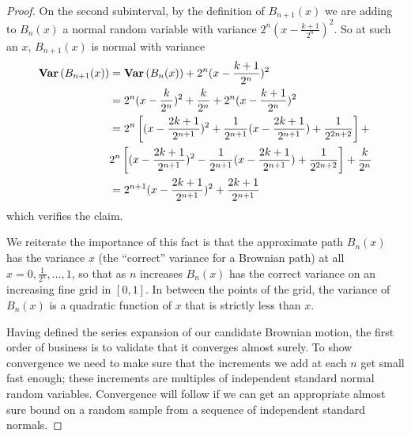\begin{proof}
On the second subinterval, by the definition of $B_{n+1}(x)$ we are
adding to $B_n(x)$ a normal random variable with variance
$2^n(x-\frac{k+1}{2^n})^2$.  So at such an $x$, $B_{n+1}(x)$ is normal
with variance 
\begin{align*}
\textbf{Var} \left (B_{n+1}(x) \right ) &= \textbf{Var} \left (B_{n}(x) \right )  +
2^n(x-\frac{k+1}{2^n})^2  \\
&= 2^n(x-\frac{k}{2^n})^2 + \frac{k}{2^n} + 2^n(x-\frac{k+1}{2^n})^2
\\
&=2^n \left[(x-\frac{2k+1}{2^{n+1}})^2 + \frac{1}{2^{n+1}}(x -
  \frac{2k+1}{2^{n+1}}) + \frac{1}{2^{2n+2}}\right] + \\
&2^n \left[(x-\frac{2k+1}{2^{n+1}})^2 - \frac{1}{2^{n+1}}(x -
  \frac{2k+1}{2^{n+1}}) + \frac{1}{2^{2n+2}}\right] + \frac{k}{2^n} \\
&=2^{n+1} (x-\frac{2k+1}{2^{n+1}})^2 + \frac{2k+1}{2^{n+1}}
\end{align*}
which verifies the claim.

We reiterate the importance of this fact is that the approximate path
$B_n(x)$ has the variance $x$ (the ``correct'' variance for a Brownian
path) at all $x = 0, \frac{1}{2^n}, \dots,1$, so that as $n$ increases
$B_n(x)$ has the correct variance on an increasing fine grid in
$[0,1]$.  In between the points of the grid, the variance of $B_n(x)$
is a quadratic function of $x$ that is strictly less than $x$.

Having defined the series expansion of our candidate Brownian motion,
the first order of business is to validate that it converges almost
surely.  To show convergence we need to make sure
that the increments we add at each $n$ get small fast enough; these increments are
multiples of independent standard normal random variables.
Convergence will follow if we can get an appropriate almost sure bound
on a random sample from a sequence of independent standard normals.


\end{proof}
